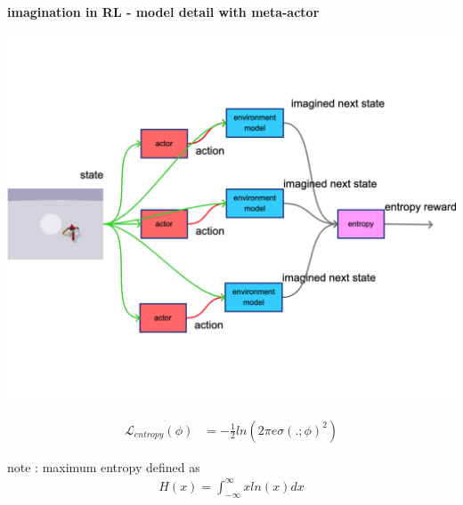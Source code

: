 \documentclass[xcolor=dvipsnames]{beamer}
\begin{document}
\begin{frame}{\bf imagination in RL - model detail with meta-actor}

  {\centering \includegraphics[scale=0.08]{../diagrams/imaginationentropy.png}}

  \begin{align*}
    \mathcal{L}_{entropy}(\phi) &= -\frac{1}{2} ln(2\pi e \sigma(.;\phi)^2)
  \end{align*}


  note : maximum entropy defined as
    \begin{align*}
      H(x) = \int_{-\infty}^{\infty} x ln(x)dx
    \end{align*}
\end{frame}
\end{document}
